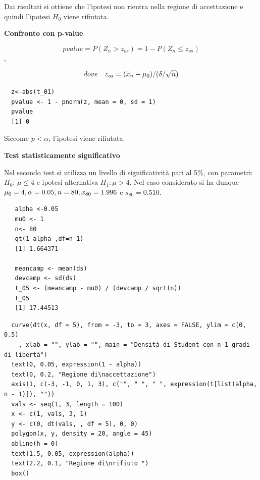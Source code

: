 Dai risultati si ottiene che l'ipotesi non rientra nella regione di accettazione e quindi l'ipotesi $H_0$ viene rifiutata.

\vspace{5mm}
\noindent \textbf{Confronto con p-value}

\[pvalue = P(Z_n > z_{os}) = 1-P(Z_n \leq z_{os})\],

\[dove \quad z_{os} = (\Bar{x}_n - \mu_0)/(\delta/\sqrt{n})\]

\vspace{5mm}
\begin{lstlisting}
  z<-abs(t_01)
  pvalue <- 1 - pnorm(z, mean = 0, sd = 1)
  pvalue
  [1] 0
\end{lstlisting}

Siccome $p<\alpha$, l'ipotesi viene rifiutata.
 
\vspace{5mm}
\noindent \textbf{Test statisticamente significativo}

Nel secondo test si utilizza un livello di significatività pari al 5\%, con parametri: $H_0$: $\mu \leq 4$ e ipotesi alternativa $H_1: \mu > 4$. Nel caso considerato si ha dunque $\mu_0 = 4, \alpha = 0.05, n = 80, \Bar{x_{80}} = 1.996$ e $s_{80} = 0.510$.

\vspace{5mm}
\begin{lstlisting}
   alpha <-0.05
   mu0 <- 1
   n<- 80
   qt(1-alpha ,df=n-1)
   [1] 1.664371

   meancamp <- mean(ds)
   devcamp <- sd(ds)
   t_05 <- (meancamp - mu0) / (devcamp / sqrt(n))
   t_05
   [1] 17.44513
\end{lstlisting}

\vspace{5mm}
\begin{lstlisting}
  curve(dt(x, df = 5), from = -3, to = 3, axes = FALSE, ylim = c(0, 0.5)
    , xlab = "", ylab = "", main = "Densità di Student con n-1 gradi di libertà")
  text(0, 0.05, expression(1 - alpha))
  text(0, 0.2, "Regione di\naccettazione")
  axis(1, c(-3, -1, 0, 1, 3), c("", " ", " ", expression(t[list(alpha, n - 1)]), ""))
  vals <- seq(1, 3, length = 100)
  x <- c(1, vals, 3, 1)
  y <- c(0, dt(vals, , df = 5), 0, 0)
  polygon(x, y, density = 20, angle = 45)
  abline(h = 0)
  text(1.5, 0.05, expression(alpha))
  text(2.2, 0.1, "Regione di\nrifiuto ")
  box()
\end{lstlisting}

